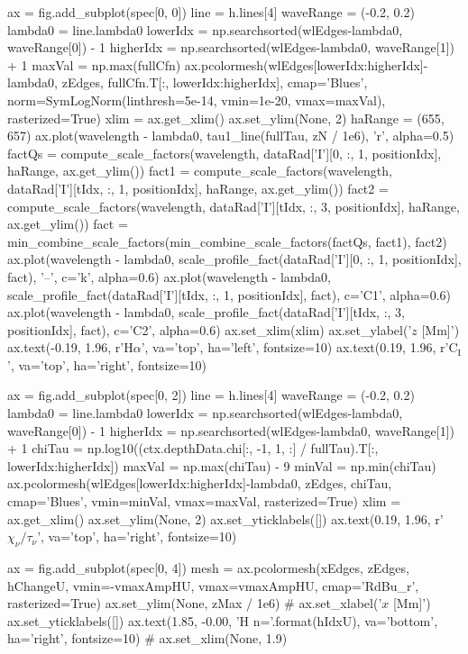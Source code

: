 \begin{pycode}[2DRT]
    ax = fig.add_subplot(spec[0, 0])
    line = h.lines[4]
    waveRange = (-0.2, 0.2)
    lambda0 = line.lambda0
    lowerIdx = np.searchsorted(wlEdges-lambda0, waveRange[0]) - 1
    higherIdx = np.searchsorted(wlEdges-lambda0, waveRange[1]) + 1
    maxVal = np.max(fullCfn)
    ax.pcolormesh(wlEdges[lowerIdx:higherIdx]-lambda0, zEdges, fullCfn.T[:, lowerIdx:higherIdx],
                  cmap='Blues', norm=SymLogNorm(linthresh=5e-14, vmin=1e-20, vmax=maxVal), rasterized=True)
    xlim = ax.get_xlim()
    ax.set_ylim(None, 2)
    haRange = (655, 657)
    ax.plot(wavelength - lambda0, tau1_line(fullTau, zN / 1e6), 'r', alpha=0.5)
    factQs = compute_scale_factors(wavelength, dataRad['I'][0, :, 1, positionIdx],
                                   haRange, ax.get_ylim())
    fact1 = compute_scale_factors(wavelength, dataRad['I'][tIdx, :, 1, positionIdx],
                                   haRange, ax.get_ylim())
    fact2 = compute_scale_factors(wavelength, dataRad['I'][tIdx, :, 3, positionIdx],
                                   haRange, ax.get_ylim())
    fact = min_combine_scale_factors(min_combine_scale_factors(factQs, fact1), fact2)
    ax.plot(wavelength - lambda0,
            scale_profile_fact(dataRad['I'][0, :, 1, positionIdx], fact), '--', c='k', alpha=0.6)
    ax.plot(wavelength - lambda0,
            scale_profile_fact(dataRad['I'][tIdx, :, 1, positionIdx], fact), c='C1', alpha=0.6)
    ax.plot(wavelength - lambda0,
            scale_profile_fact(dataRad['I'][tIdx, :, 3, positionIdx], fact), c='C2', alpha=0.6)
    ax.set_xlim(xlim)
    ax.set_ylabel('$z$ [Mm]')
    ax.text(-0.19, 1.96, r'H$\alpha$', va='top', ha='left', fontsize=10)
    ax.text(0.19, 1.96, r'C$_\mathrm{I}$', va='top', ha='right', fontsize=10)

    ax = fig.add_subplot(spec[0, 2])
    line = h.lines[4]
    waveRange = (-0.2, 0.2)
    lambda0 = line.lambda0
    lowerIdx = np.searchsorted(wlEdges-lambda0, waveRange[0]) - 1
    higherIdx = np.searchsorted(wlEdges-lambda0, waveRange[1]) + 1
    chiTau = np.log10((ctx.depthData.chi[:, -1, 1, :] / fullTau).T[:, lowerIdx:higherIdx])
    maxVal = np.max(chiTau) - 9
    minVal = np.min(chiTau)
    ax.pcolormesh(wlEdges[lowerIdx:higherIdx]-lambda0, zEdges,
                  chiTau,
                  cmap='Blues', vmin=minVal, vmax=maxVal, rasterized=True)
    xlim = ax.get_xlim()
    ax.set_ylim(None, 2)
    ax.set_yticklabels([])
    ax.text(0.19, 1.96, r'$\chi_\nu / \tau_\nu$', va='top', ha='right', fontsize=10)

    ax = fig.add_subplot(spec[0, 4])
    mesh = ax.pcolormesh(xEdges, zEdges, hChangeU, vmin=-vmaxAmpHU, vmax=vmaxAmpHU,
                         cmap='RdBu_r', rasterized=True)
    ax.set_ylim(None, zMax / 1e6)
    # ax.set_xlabel('$x$ [Mm]')
    ax.set_yticklabels([])
    ax.text(1.85, -0.00, 'H n={}'.format(hIdxU), va='bottom', ha='right', fontsize=10)
    # ax.set_xlim(None, 1.9)


\end{pycode}
